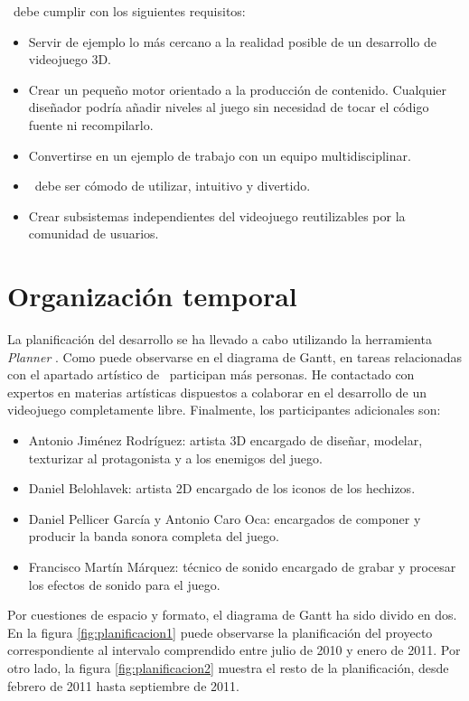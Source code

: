 \documentclass[a4paper,11pt]{article}
\begin{document}
\noindent \juego\ debe cumplir con los siguientes requisitos:

\begin{itemize}
    \item Servir de ejemplo lo más cercano a la realidad posible de un
    desarrollo de videojuego 3D.
    \item Crear un pequeño motor orientado a la producción de contenido.
    Cualquier diseñador podría añadir niveles al juego sin necesidad
    de tocar el código fuente ni recompilarlo.
    \item Convertirse en un ejemplo de trabajo con un equipo multidisciplinar.
    \item \juego\ debe ser cómodo de utilizar, intuitivo y divertido.
    \item Crear subsistemas independientes del videojuego reutilizables
    por la comunidad de usuarios.
\end{itemize}

\section{Organización temporal}

\noindent La planificación del desarrollo se ha llevado a cabo utilizando
la herramienta \textit{Planner} \cite{website:planner}. Como puede observarse en el diagrama de Gantt,
en tareas relacionadas con el apartado artístico de \juego\ participan
más personas. He contactado con expertos en materias artísticas dispuestos
a colaborar en el desarrollo de un videojuego completamente libre. Finalmente,
los participantes adicionales son:

\begin{itemize}
    \itemsep0em
    \item Antonio Jiménez Rodríguez: artista 3D encargado de diseñar, modelar,
    texturizar al protagonista y a los enemigos del juego.
    \item Daniel Belohlavek: artista 2D encargado de los iconos de los hechizos.
    \item Daniel Pellicer García y Antonio Caro Oca: encargados de componer
    y producir la banda sonora completa del juego.
    \item Francisco Martín Márquez: técnico de sonido encargado de grabar
    y procesar los efectos de sonido para el juego.
\end{itemize}

\noindent Por cuestiones de espacio y formato, el diagrama de Gantt ha sido divido
en dos. En la figura \ref{fig:planificacion1} puede observarse la planificación
del proyecto correspondiente al intervalo comprendido entre julio de 2010
y enero de 2011. Por otro lado, la figura \ref{fig:planificacion2} muestra
el resto de la planificación, desde febrero de 2011 hasta septiembre de 2011.
\end{document}
